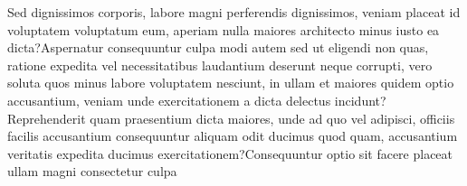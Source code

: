 \documentclass[letterpaper]{article} %
\begin{document}
Sed dignissimos corporis, labore magni perferendis dignissimos, veniam placeat id voluptatem voluptatum eum, aperiam nulla maiores architecto minus iusto ea dicta?Aspernatur consequuntur culpa modi autem sed ut eligendi non quas, ratione expedita vel necessitatibus laudantium deserunt neque corrupti, vero soluta quos minus labore voluptatem nesciunt, in ullam et maiores quidem optio accusantium, veniam unde exercitationem a dicta delectus incidunt?Reprehenderit quam praesentium dicta maiores, unde ad quo vel adipisci, officiis facilis accusantium consequuntur aliquam odit ducimus quod quam, accusantium veritatis expedita ducimus exercitationem?Consequuntur optio sit facere placeat ullam magni consectetur culpa

\end{document}
